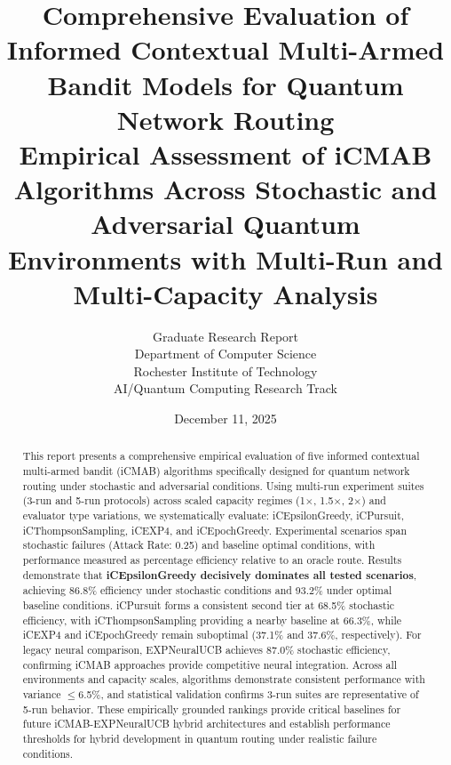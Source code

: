 \documentclass[12pt,a4paper]{article}
\title{\textbf{Comprehensive Evaluation of Informed Contextual Multi-Armed Bandit Models for Quantum Network Routing}\\
\large{Empirical Assessment of iCMAB Algorithms Across Stochastic and Adversarial Quantum Environments with Multi-Run and Multi-Capacity Analysis}}
\author{Graduate Research Report\\
Department of Computer Science\\
Rochester Institute of Technology\\
AI/Quantum Computing Research Track}
\date{December 11, 2025}
\newcommand{\primarytext}[1]{\textcolor{primaryblue}{\textbf{#1}}}
\begin{document}
\maketitle

\begin{abstract}
This report presents a comprehensive empirical evaluation of five informed contextual multi-armed bandit (iCMAB) algorithms specifically designed for quantum network routing under stochastic and adversarial conditions. Using multi-run experiment suites (3-run and 5-run protocols) across scaled capacity regimes (1$\times$, 1.5$\times$, 2$\times$) and evaluator type variations, we systematically evaluate: iCEpsilonGreedy, iCPursuit, iCThompsonSampling, iCEXP4, and iCEpochGreedy. Experimental scenarios span stochastic failures (Attack Rate: 0.25) and baseline optimal conditions, with performance measured as percentage efficiency relative to an oracle route. Results demonstrate that \primarytext{iCEpsilonGreedy decisively dominates all tested scenarios}, achieving 86.8\% efficiency under stochastic conditions and 93.2\% under optimal baseline conditions. iCPursuit forms a consistent second tier at 68.5\% stochastic efficiency, with iCThompsonSampling providing a nearby baseline at 66.3\%, while iCEXP4 and iCEpochGreedy remain suboptimal (37.1\% and 37.6\%, respectively). For legacy neural comparison, EXPNeuralUCB achieves 87.0\% stochastic efficiency, confirming iCMAB approaches provide competitive neural integration. Across all environments and capacity scales, algorithms demonstrate consistent performance with variance $\leq$6.5\%, and statistical validation confirms 3-run suites are representative of 5-run behavior. These empirically grounded rankings provide critical baselines for future iCMAB-EXPNeuralUCB hybrid architectures and establish performance thresholds for hybrid development in quantum routing under realistic failure conditions.
\end{abstract}

\newpage
\tableofcontents

\newpage
\end{document}
